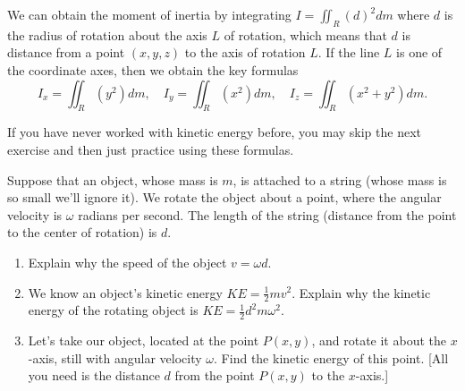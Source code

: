 {\begin{definition}
We can obtain the moment of inertia by integrating $I=\iint_R (d)^2 dm$ where $d$ is the radius of rotation about the axis $L$ of rotation, which means that $d$  is distance from a point $(x,y,z)$ to the axis of rotation $L$. If the line $L$ is one of the coordinate axes, then we obtain the key formulas 
$$
I_x = \iint_R (y^2)dm,\quad
I_y = \iint_R (x^2)dm,\quad
I_z = \iint_R (x^2+y^2)dm
.$$
\end{definition}

If you have never worked with kinetic energy before, you may skip the next exercise and then just practice using these formulas.

\begin{problem}
%
%
 Suppose that an object, whose mass is $m$, is attached to a string (whose mass is so small we'll ignore it). We rotate the object about a point, where the angular velocity is $\omega$ radians per second. The length of the string (distance from the point to the center of rotation) is $d$.
 \begin{enumerate}
 \item Explain why the speed of the object $v=\omega d$.  
 \item We know an object's kinetic energy $KE=\frac{1}{2}mv^2$. 
Explain why the kinetic energy of the rotating object is $KE = \frac{1}{2}d^2m\omega^2$. 
  \item Let's take our object, located at the point $P(x,y)$, and rotate it about the $x$-axis, still with angular velocity $\omega$. Find the kinetic energy of this point. [All you need is the distance $d$ from the point $P(x,y)$ to the $x$-axis.]

\end{enumerate}
\end{problem}}
